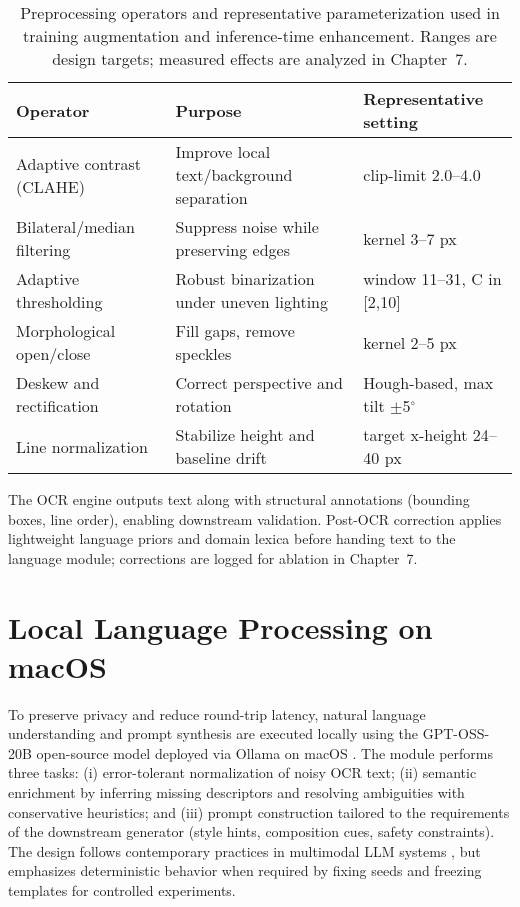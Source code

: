 \begin{table}[t]
  \centering
  \caption{Preprocessing operators and representative parameterization used in training augmentation and inference-time enhancement. Ranges are design targets; measured effects are analyzed in Chapter~7.}
  \label{tab:preproc}
  \begin{tabular}{l l l}
    \hline
    Operator & Purpose & Representative setting \\
    \hline
    Adaptive contrast (CLAHE) & Improve local text/background separation & clip-limit 2.0--4.0 \\
    Bilateral/median filtering & Suppress noise while preserving edges & kernel 3--7 px \\
    Adaptive thresholding & Robust binarization under uneven lighting & window 11--31, C in [2,10] \\
    Morphological open/close & Fill gaps, remove speckles & kernel 2--5 px \\
    Deskew and rectification & Correct perspective and rotation & Hough-based, max tilt $\pm$5$^\circ$ \\
    Line normalization & Stabilize height and baseline drift & target x-height 24--40 px \\
    \hline
  \end{tabular}
\end{table}

The OCR engine outputs text along with structural annotations (bounding boxes, line order), enabling downstream validation. Post-OCR correction applies lightweight language priors and domain lexica before handing text to the language module; corrections are logged for ablation in Chapter~7.

\section{Local Language Processing on macOS}

To preserve privacy and reduce round-trip latency, natural language understanding and prompt synthesis are executed locally using the GPT-OSS-20B open-source model deployed via Ollama on macOS \cite{openai2025gptoss}. The module performs three tasks: (i) error-tolerant normalization of noisy OCR text; (ii) semantic enrichment by inferring missing descriptors and resolving ambiguities with conservative heuristics; and (iii) prompt construction tailored to the requirements of the downstream generator (style hints, composition cues, safety constraints). The design follows contemporary practices in multimodal LLM systems \cite{qin2024comprehensive, jin2024mm}, but emphasizes deterministic behavior when required by fixing seeds and freezing templates for controlled experiments.

